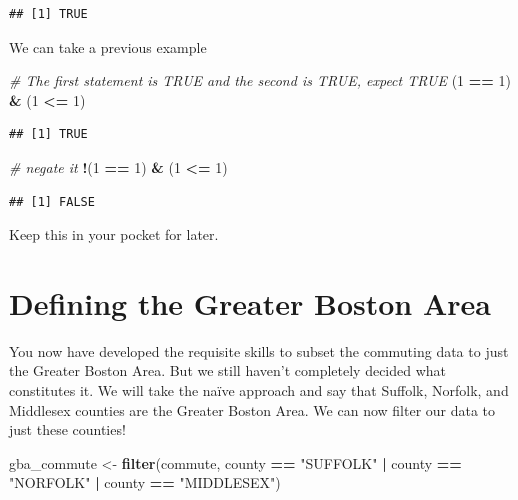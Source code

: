 \documentclass[
]{book}
\newenvironment{Shaded}{\begin{snugshade}}{\end{snugshade}}
\newcommand{\CommentTok}[1]{\textcolor[rgb]{0.56,0.35,0.01}{\textit{#1}}}
\newcommand{\DecValTok}[1]{\textcolor[rgb]{0.00,0.00,0.81}{#1}}
\newcommand{\KeywordTok}[1]{\textcolor[rgb]{0.13,0.29,0.53}{\textbf{#1}}}
\newcommand{\NormalTok}[1]{#1}
\newcommand{\OperatorTok}[1]{\textcolor[rgb]{0.81,0.36,0.00}{\textbf{#1}}}
\newcommand{\StringTok}[1]{\textcolor[rgb]{0.31,0.60,0.02}{#1}}
\begin{document}
\begin{verbatim}
## [1] TRUE
\end{verbatim}

We can take a previous example

\begin{Shaded}
\begin{Highlighting}[]
\CommentTok{\# The first statement is TRUE and the second is TRUE, expect TRUE}
\NormalTok{(}\DecValTok{1} \OperatorTok{==}\StringTok{ }\DecValTok{1}\NormalTok{) }\OperatorTok{\&}\StringTok{ }\NormalTok{(}\DecValTok{1} \OperatorTok{\textless{}=}\StringTok{ }\DecValTok{1}\NormalTok{)}
\end{Highlighting}
\end{Shaded}

\begin{verbatim}
## [1] TRUE
\end{verbatim}

\begin{Shaded}
\begin{Highlighting}[]
\CommentTok{\# negate it}
\OperatorTok{!}\NormalTok{(}\DecValTok{1} \OperatorTok{==}\StringTok{ }\DecValTok{1}\NormalTok{) }\OperatorTok{\&}\StringTok{ }\NormalTok{(}\DecValTok{1} \OperatorTok{\textless{}=}\StringTok{ }\DecValTok{1}\NormalTok{)}
\end{Highlighting}
\end{Shaded}

\begin{verbatim}
## [1] FALSE
\end{verbatim}

Keep this in your pocket for later.

\hypertarget{defining-the-greater-boston-area}{%
\section{Defining the Greater Boston Area}\label{defining-the-greater-boston-area}}

You now have developed the requisite skills to subset the commuting data to just the Greater Boston Area. But we still haven't completely decided what constitutes it. We will take the naïve approach and say that Suffolk, Norfolk, and Middlesex counties are the Greater Boston Area. We can now filter our data to just these counties!

\begin{Shaded}
\begin{Highlighting}[]
\NormalTok{gba\_commute \textless{}{-}}\StringTok{ }\KeywordTok{filter}\NormalTok{(commute, county }\OperatorTok{==}\StringTok{ "SUFFOLK"} \OperatorTok{|}\StringTok{ }\NormalTok{county }\OperatorTok{==}\StringTok{ "NORFOLK"} \OperatorTok{|}\StringTok{ }\NormalTok{county }\OperatorTok{==}\StringTok{ "MIDDLESEX"}\NormalTok{)}
\end{Highlighting}
\end{Shaded}
\end{document}
